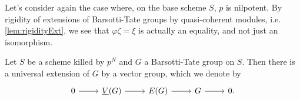 \begin{rem}[]
	Let's consider again the case where, on the base
	scheme $S$, $p$ is nilpotent.
	By rigidity of extensions of Barsotti-Tate groups
	by quasi-coherent modules, i.e. \cref{lem:rigidityExt}, 
	we see that $\varphi\zeta = \xi$ is
	actually an equality, and not just an isomorphism.
\end{rem}


\begin{prop}[]
	Let $S$ be a scheme killed by $p^N$ and $G$
	a Barsotti-Tate group on $S$.
	Then there is a universal extension of $G$ by a vector group,
	which we denote by
	\begin{equation*}
	\begin{tikzcd}
		0 \arrow[r, "", rightarrow] &
		\underline{V}(G) \arrow[r, "", rightarrow] &
		E(G) \arrow[r, "", rightarrow] &
		G \arrow[r, "", rightarrow] &
		0
	.\end{tikzcd}
	\end{equation*}
\end{prop}

